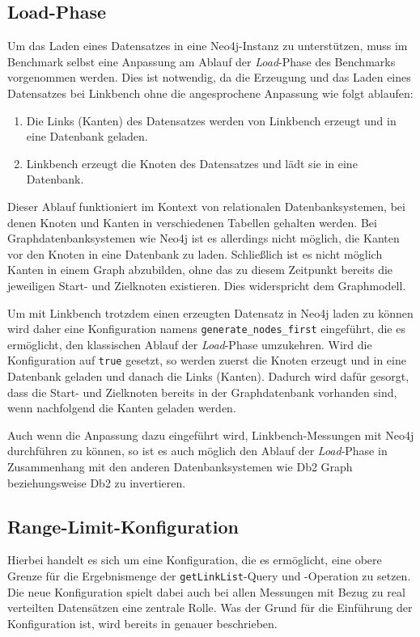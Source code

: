 \subsection{Load-Phase}
\label{implementierung:anpassung:load}
Um das Laden eines Datensatzes in eine Neo4j-Instanz zu unterstützen, muss im Benchmark selbst eine Anpassung am Ablauf der \textit{Load}-Phase des Benchmarks vorgenommen werden. Dies ist notwendig, da die Erzeugung und das Laden eines Datensatzes bei Linkbench ohne die angesprochene Anpassung wie folgt ablaufen:
\begin{enumerate}
    \item Die Links (Kanten) des Datensatzes werden von Linkbench erzeugt und in eine Datenbank geladen. 
    \item Linkbench erzeugt die Knoten des Datensatzes und lädt sie in eine Datenbank. 
\end{enumerate}
Dieser Ablauf funktioniert im Kontext von relationalen Datenbanksystemen, bei denen Knoten und Kanten in verschiedenen Tabellen gehalten werden. Bei Graphdatenbanksystemen wie Neo4j ist es allerdings nicht möglich, die Kanten vor den Knoten in eine Datenbank zu laden. Schließlich ist es nicht möglich Kanten in einem Graph abzubilden, ohne das zu diesem Zeitpunkt bereits die jeweiligen Start- und Zielknoten existieren. Dies widerspricht dem Graphmodell.

Um mit Linkbench trotzdem einen erzeugten Datensatz in Neo4j laden zu können wird daher eine Konfiguration namens \texttt{generate\_nodes\_first} eingeführt, die es ermöglicht, den klassischen Ablauf der \textit{Load}-Phase umzukehren. Wird die Konfiguration auf \texttt{true} gesetzt, so werden zuerst die Knoten erzeugt und in eine Datenbank geladen und danach die Links (Kanten). Dadurch wird dafür gesorgt, dass die Start- und Zielknoten bereits in der Graphdatenbank vorhanden sind, wenn nachfolgend die Kanten geladen werden. 

Auch wenn die Anpassung dazu eingeführt wird, Linkbench-Messungen mit Neo4j durchführen zu können, so ist es auch möglich den Ablauf der \textit{Load}-Phase in Zusammenhang mit den anderen Datenbanksystemen wie Db2 Graph beziehungsweise Db2 zu invertieren. 

\subsection{Range-Limit-Konfiguration}
\label{implementierung:anpassung:limit}
Hierbei handelt es sich um eine Konfiguration, die es ermöglicht, eine obere Grenze für die Ergebnismenge der \texttt{getLinkList}-Query und -Operation zu setzen. Die neue Konfiguration spielt dabei auch bei allen Messungen mit Bezug zu real verteilten Datensätzen eine zentrale Rolle. Was der Grund für die Einführung der Konfiguration ist, wird bereits in  genauer beschrieben. 


